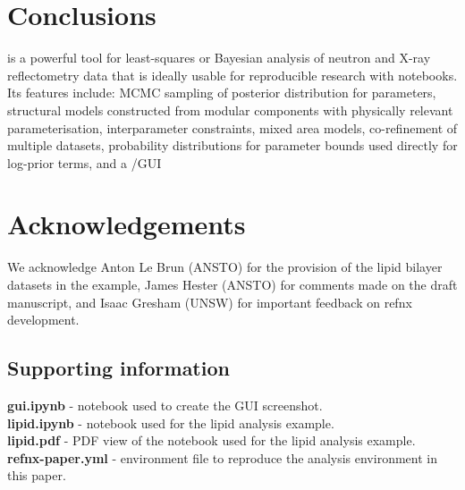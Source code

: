 \documentclass[12pt]{article}
\begin{document}
\section*{Conclusions}\label{conclusions}
 is a powerful tool for least-squares or Bayesian analysis of neutron and X-ray reflectometry data that is ideally usable for reproducible research with \Jupyter notebooks. Its features include: MCMC sampling of posterior distribution for parameters, structural models constructed from modular components with physically relevant parameterisation, interparameter constraints, mixed area models, co-refinement of multiple datasets, probability distributions for parameter bounds used directly for log-prior terms, and a \Jupyter/\ipywidgets GUI

\section*{Acknowledgements}
We acknowledge Anton Le Brun (ANSTO) for the provision of the lipid bilayer datasets in the example, James Hester (ANSTO) for comments made on the draft manuscript, and Isaac Gresham (UNSW) for important feedback on refnx development.

\subsection*{Supporting information}
\textbf{gui.ipynb} - \Jupyter notebook used to create the GUI screenshot.\\
\textbf{lipid.ipynb} - \Jupyter notebook used for the lipid analysis example.\\
\textbf{lipid.pdf} - PDF view of the \Jupyter notebook used for the lipid analysis example.\\
\textbf{refnx-paper.yml} - \conda environment file to reproduce the analysis environment in this paper.

{}

\end{document}
